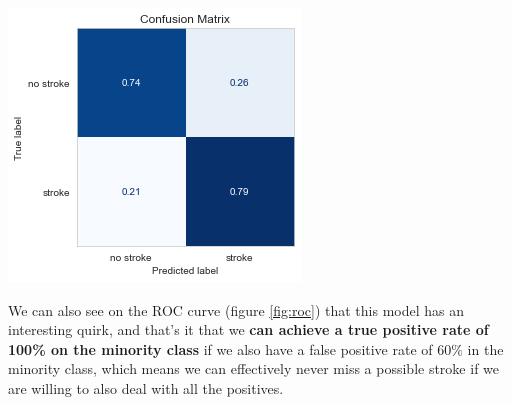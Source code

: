 \documentclass[landscape,a0paper,fontscale=0.285]{baposter} %
\begin{document}
\begin{poster}
{\begin{center}
\includegraphics[width=.7\linewidth]{LogRedResult.png}
\end{center}

We can also see on the ROC curve (figure \ref{fig:roc}) that this model has an interesting quirk, and that's it that we \textbf{can achieve a true positive rate of 100\% on the minority class} if we also have a false positive rate of $60\%$ in the minority class, which means we can effectively never miss a possible stroke if we are willing to also deal with all the positives.

}


\end{poster}
\end{document}
